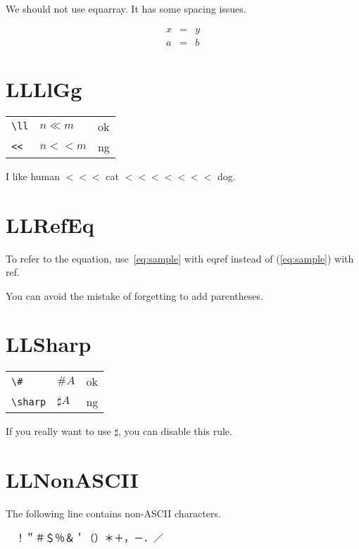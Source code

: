 \documentclass[a4paper]{article}
\newcommand{\tA}[1]{\textcolor{cA}{#1}}
\newcommand{\tD}[1]{\textcolor{cD}{#1}}
\begin{document}
We should not use eqnarray. It has some spacing issues.

\begin{eqnarray*}
	x & = & y \\
	a & = & b
\end{eqnarray*}

\section{LLLlGg}

\begin{table}[H]
	\centering
	\begin{tabular}{lll}
		\verb|\ll| & $n\ll m$ & \tA{ok} \\
		\verb|<<|  & $n << m$ & \tD{ng} \\
	\end{tabular}
\end{table}

I like human $<<<$ cat $<<<<<<<$ dog.

\section{LLRefEq}

To refer to the equation, use~\eqref{eq:sample} with eqref instead of (\ref{eq:sample}) with ref.

You can avoid the mistake of forgetting to add parentheses.

\section{LLSharp}

\begin{table}[H]
	\centering
	\begin{tabular}{lll}
		\verb|\#|     & $\#A$      & \tA{ok} \\
		\verb|\sharp| & $\sharp A$ & \tD{ng}
	\end{tabular}
\end{table}

If you really want to use $\sharp$, you can disable this rule.

\section{LLNonASCII}

The following line contains non-ASCII characters.

	{　}！＂＃＄％＆＇（）＊＋，－．／
\end{document}
